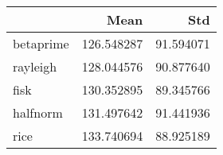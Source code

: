 \begin{tabular}{lrr}
\toprule
{} &        Mean &        Std \\
\midrule
betaprime &  126.548287 &  91.594071 \\
rayleigh  &  128.044576 &  90.877640 \\
fisk      &  130.352895 &  89.345766 \\
halfnorm  &  131.497642 &  91.441936 \\
rice      &  133.740694 &  88.925189 \\
\bottomrule
\end{tabular}
